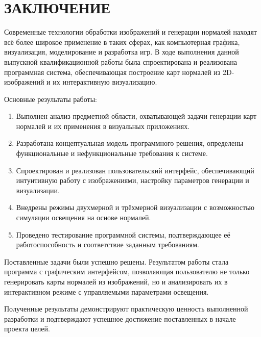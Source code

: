 \section*{ЗАКЛЮЧЕНИЕ}

Современные технологии обработки изображений и генерации нормалей находят всё более широкое применение в таких сферах, как компьютерная графика, визуализация, моделирование и разработка игр. В ходе выполнения данной выпускной квалификационной работы была спроектирована и реализована программная система, обеспечивающая построение карт нормалей из 2D-изображений и их интерактивную визуализацию.

Основные результаты работы:

\begin{enumerate}
	\item Выполнен анализ предметной области, охватывающей задачи генерации карт нормалей и их применения в визуальных приложениях.
	\item Разработана концептуальная модель программного решения, определены функциональные и нефункциональные требования к системе.
	\item Спроектирован и реализован пользовательский интерфейс, обеспечивающий интуитивную работу с изображениями, настройку параметров генерации и визуализации.
	\item Внедрены режимы двухмерной и трёхмерной визуализации с возможностью симуляции освещения на основе нормалей.
	\item Проведено тестирование программной системы, подтверждающее её работоспособность и соответствие заданным требованиям.
\end{enumerate}

Поставленные задачи были успешно решены. Результатом работы стала программа с графическим интерфейсом, позволяющая пользователю не только генерировать карты нормалей из изображений, но и анализировать их в интерактивном режиме с управляемыми параметрами освещения.

Полученные результаты демонстрируют практическую ценность выполненной разработки и подтверждают успешное достижение поставленных в начале проекта целей.

